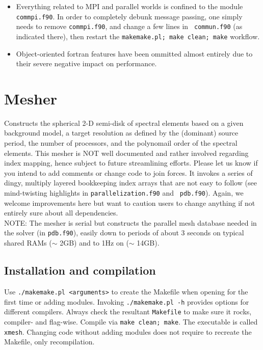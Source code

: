 \documentclass[11pt,letter,fleqn,english,notitlepage]{article}
\begin{document}
\begin{itemize}
    \item Everything related to MPI and parallel worlds is confined to the
    module {\tt commpi.f90}. In order to completely debunk message passing, one
    simply needs to remove {\tt commpi.f90}, and change a few lines in {\tt
    commun.f90} (as indicated there), then restart the {\tt makemake.pl; make
    clean; make} workflow. 

    \item Object-oriented fortran features have been ommitted almost entirely
    due to their severe negative impact on performance.
\end{itemize}

\section{Mesher}
Constructs the spherical 2-D semi-disk of spectral elements based on a given
background model, a target resolution as defined by the (dominant) source
period, the number of processors, and the polynomail order of the spectral
elements. 
This mesher is NOT well documented and rather involved regarding
index mapping, hence subject to future streamlining efforts. Please let us know
if you intend to add comments or change code to join forces. It invokes a
series of dingy, multiply layered bookkeeping index arrays that are not easy to
follow (see mind-twisting highlights in {\tt parallelization.f90} and {\tt
pdb.f90}). Again, we welcome improvements here but want to caution users to
change anything if not entirely sure about all dependencies.\\

\noindent NOTE: The mesher is serial but constructs the parallel mesh database 
needed in the solver (in {\tt pdb.f90}), easily down to periods of about 
3 seconds on typical shared RAMs ($\sim$ 2GB) and to 1Hz on ($\sim$ 14GB). 

\subsection{Installation and compilation}
Use {\tt ./makemake.pl <arguments>} to create the Makefile when opening for the
first time or adding modules.  Invoking {\tt ./makemake.pl -h} provides options
for different compilers. Always check the resultant {\tt Makefile} to make sure
it rocks, compiler- and flag-wise. Compile via {\tt make clean; make}. The
executable is called {\tt xmesh}.  Changing code without adding modules does
not require to recreate the Makefile, only recompilation.
\end{document}
